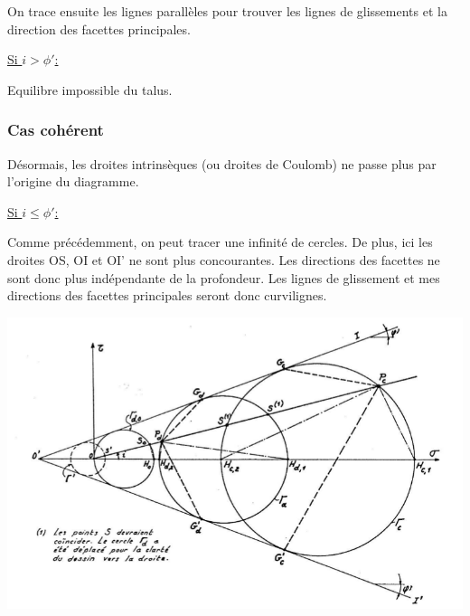             On trace ensuite les lignes parallèles pour trouver les lignes de glissements et la direction des facettes principales.
            
            \underline{Si $i > \phi'$:} 
            
            Equilibre impossible du talus.
            
        \subsubsection{Cas cohérent}
        
            Désormais, les droites intrinsèques (ou droites de Coulomb) ne passe plus par l'origine du diagramme. 
            
            \underline{Si $i \le \phi'$:} 
            
            Comme précédemment, on peut tracer une infinité de cercles. De plus, ici les droites OS, OI et OI' ne sont plus concourantes. Les directions des facettes ne sont donc plus indépendante de la profondeur. Les lignes de glissement et mes directions des facettes principales seront donc curvilignes. 
        
            \includegraphics[scale=0.8]{Holeyman/images/H10.PNG}
            
